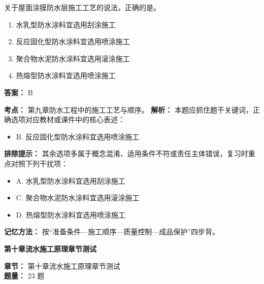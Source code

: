 \documentclass[UTF8,fontset=fandol,11pt]{ctexart}
\newcommand{\chaptertitle}[1]{\vspace{0.5em}\begin{tcolorbox}[enhanced,colback=deepblue,colframe=deepblue,arc=2mm,boxrule=0pt]\begin{center}\Large\bfseries\color{white}#1\end{center}\end{tcolorbox}\vspace{0.5em}}
\begin{document}
\begin{quizbox}[title={第 7 题}]
关于屋面涂膜防水层施工工艺的说法，正确的是。\\
\begin{enumerate}[label=\Alph*.]
\item 水乳型防水涂料宜选用刮涂施工
\item 反应固化型防水涂料宜选用喷涂施工
\item 聚合物水泥防水涂料宜选用滚涂施工
\item 热熔型防水涂料宜选用喷涂施工
\end{enumerate}
\textbf{答案：} B
\vspace{0.25em}
\begin{answerbox}[title={考点解析}]
\textbf{考点：} 第九章防水工程中的施工工艺与顺序。
\textbf{解析：} 本题应抓住题干关键词，正确选项对应教材或课件中的核心表述：
\begin{itemize}
\item B. 反应固化型防水涂料宜选用喷涂施工
\end{itemize}
\textbf{排除提示：} 其余选项多属于概念混淆、适用条件不符或责任主体错误，复习时重点对照下列干扰项：
\begin{itemize}
\item A. 水乳型防水涂料宜选用刮涂施工
\item C. 聚合物水泥防水涂料宜选用滚涂施工
\item D. 热熔型防水涂料宜选用喷涂施工
\end{itemize}
\textbf{记忆方法：} 按“准备条件—施工顺序—质量控制—成品保护”四步背。
\end{answerbox}
\end{quizbox}

\vspace{0.2em}

\chaptertitle{第十章流水施工原理章节测试}
\begin{mainbox}
\textbf{\textcolor{mainblue}{章节：}} 第十章流水施工原理章节测试\\
\textbf{\textcolor{answerred}{题量：}} 23 题
\end{mainbox}
\end{document}
